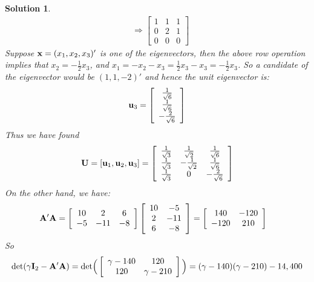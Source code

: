 \documentclass[11pt]{article}
\newtheorem{sol}{Solution}
\begin{document}
\begin{sol}
\begin{align*}
	 	&\Longrightarrow \left[\begin{array}{ccc} 1&1&1 \\ 0&2&1 \\ 0 &0&0\end{array}\right]
	 \end{align*}
	 Suppose ${\bf x} = (x_1, x_2, x_3)'$ is one of the eigenvectors, then the above row operation implies that $x_2 = -\frac{1}{2}x_3$, and $x_1 = -x_2-x_3 = \frac{1}{2}x_3 - x_3 = -\frac{1}{2}x_3$. So a candidate of the eigenvector would be $(1, 1, -2)'$ and hence the unit eigenvector is:
	 \begin{align*}
	 	{\bf u}_3 = \left[\begin{array}{c} \frac{1}{\sqrt{6}}\\ \frac{1}{\sqrt{6}}\\ -\frac{2}{\sqrt{6}}\end{array}\right]
	 \end{align*}
	 Thus we have found
	 \begin{align*}
	 	{\bf U} = [{\bf u}_1, {\bf u}_2, {\bf u}_3] = \left[\begin{array}{ccc} \frac{1}{\sqrt{3}}&\frac{1}{\sqrt{2}}&\frac{1}{\sqrt{6}}\\ \frac{1}{\sqrt{3}}&-\frac{1}{\sqrt{2}}& \frac{1}{\sqrt{6}}\\\frac{1}{\sqrt{3}}&0&-\frac{2}{\sqrt{6}}\end{array}\right]
	 \end{align*}
	 On the other hand, we have:
	 \begin{align*}
	 	 {\bf A}'{\bf A} &= \left[\begin{array}{ccc} 10&2&6 \\ -5&-11&-8 \end{array}\right]\left[\begin{array}{cc}10&-5 \\ 2&-11 \\ 6&-8 \end{array}\right] = \left[\begin{array}{cc} 140&-120 \\ -120&210  \end{array}\right]
	 \end{align*}
	 So
	 \begin{align*}
	 	\text{det}(\gamma {\bf I}_2 - {\bf A}'{\bf A}) &= \text{det}\Big(\left[\begin{array}{cc} \gamma - 140&120 \\ 120&\gamma - 210  \end{array}\right]\Big) = (\gamma - 140)(\gamma - 210) - 14,400\\

\end{align*}
\end{sol}
\end{document}

